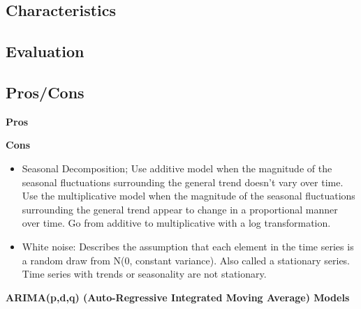 \documentclass[]{book}
\theoremstyle{definition}
\theoremstyle{definition}
\theoremstyle{definition}
\theoremstyle{remark}
\begin{document}
\subsection{Characteristics}\label{characteristics-13}

\subsection{Evaluation}\label{evaluation-17}

\subsection{Pros/Cons}\label{proscons-18}

\textbf{Pros}

\textbf{Cons}

\begin{itemize}
\item
  Seasonal Decomposition; Use additive model when the magnitude of the
  seasonal fluctuations surrounding the general trend doesn't vary over
  time. Use the multiplicative model when the magnitude of the seasonal
  fluctuations surrounding the general trend appear to change in a
  proportional manner over time. Go from additive to multiplicative with
  a log transformation.
\item
  White noise: Describes the assumption that each element in the time
  series is a random draw from N(0, constant variance). Also called a
  stationary series. Time series with trends or seasonality are not
  stationary.
\end{itemize}

\textbf{ARIMA(p,d,q) (Auto-Regressive Integrated Moving Average) Models}
\end{document}
